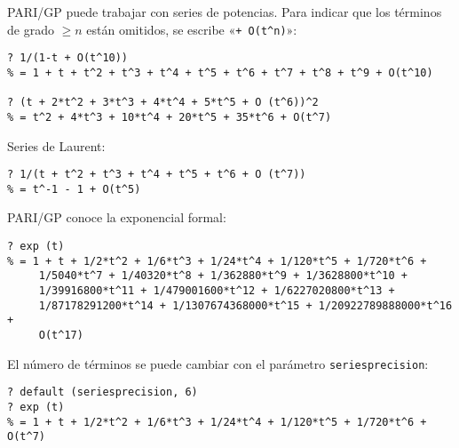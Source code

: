 \documentclass{article}
\numberwithin{equation}{section}
\theoremstyle{definition}
\begin{document}
\begin{shaded}
  \small\noindent PARI/GP puede trabajar con series de potencias. Para indicar
  que los términos de grado $\ge n$ están omitidos, se escribe
  «\verb|+ O(t^n)|»:

\begin{verbatim}
? 1/(1-t + O(t^10))
% = 1 + t + t^2 + t^3 + t^4 + t^5 + t^6 + t^7 + t^8 + t^9 + O(t^10)

? (t + 2*t^2 + 3*t^3 + 4*t^4 + 5*t^5 + O (t^6))^2
% = t^2 + 4*t^3 + 10*t^4 + 20*t^5 + 35*t^6 + O(t^7)
\end{verbatim}

  \noindent Series de Laurent:

\begin{verbatim}
? 1/(t + t^2 + t^3 + t^4 + t^5 + t^6 + O (t^7))
% = t^-1 - 1 + O(t^5)
\end{verbatim}

  \noindent PARI/GP conoce la exponencial formal:

\begin{verbatim}
? exp (t)
% = 1 + t + 1/2*t^2 + 1/6*t^3 + 1/24*t^4 + 1/120*t^5 + 1/720*t^6 +
     1/5040*t^7 + 1/40320*t^8 + 1/362880*t^9 + 1/3628800*t^10 +
     1/39916800*t^11 + 1/479001600*t^12 + 1/6227020800*t^13 +
     1/87178291200*t^14 + 1/1307674368000*t^15 + 1/20922789888000*t^16 +
     O(t^17)
\end{verbatim}

  \noindent El número de términos se puede cambiar con el parámetro \verb|seriesprecision|:

\begin{verbatim}
? default (seriesprecision, 6)
? exp (t)
% = 1 + t + 1/2*t^2 + 1/6*t^3 + 1/24*t^4 + 1/120*t^5 + 1/720*t^6 + O(t^7)
\end{verbatim}

%
%
%
\end{shaded}
\end{document}
